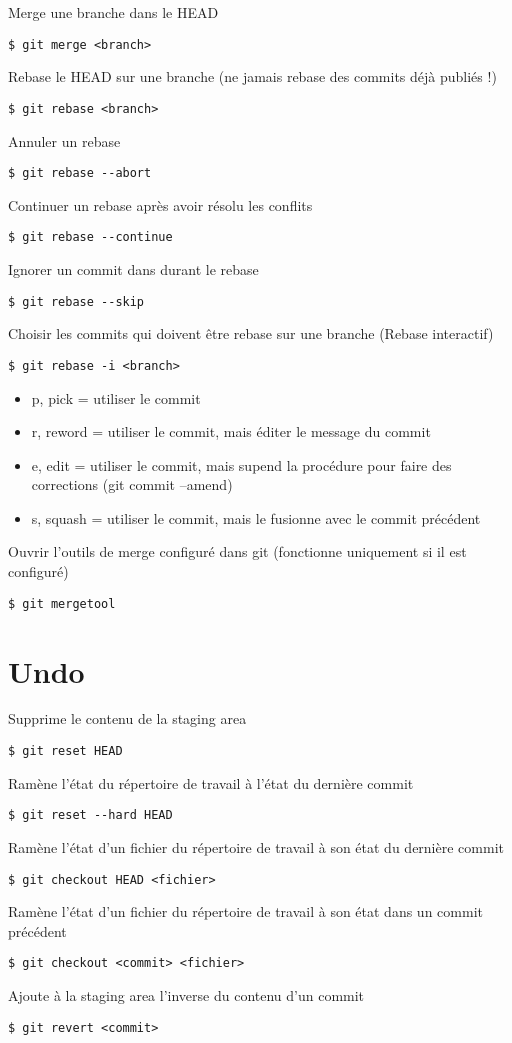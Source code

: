 \documentclass[jou,floatsintext]{apa6}
\begin{document}
Merge une branche dans le HEAD
\begin{lstlisting}
$ git merge <branch>
\end{lstlisting}
Rebase le HEAD sur une branche (ne jamais rebase des commits déjà publiés !)
\begin{lstlisting}
$ git rebase <branch> 
\end{lstlisting}
Annuler un rebase 
\begin{lstlisting}
$ git rebase --abort 
\end{lstlisting}
Continuer un rebase après avoir résolu les conflits 
\begin{lstlisting}
$ git rebase --continue 
\end{lstlisting}
Ignorer un commit dans durant le rebase
\begin{lstlisting}
$ git rebase --skip
\end{lstlisting}
Choisir les commits qui doivent être rebase sur une branche (Rebase interactif) 
\begin{lstlisting}
$ git rebase -i <branch> 
\end{lstlisting}
\begin{itemize}
	\item p, pick = utiliser le commit
	\item r, reword = utiliser le commit, mais éditer le message du commit
	\item e, edit = utiliser le commit, mais supend la procédure pour faire des corrections (git commit --amend)
	\item s, squash = utiliser le commit, mais le fusionne avec le commit précédent
\end{itemize}
Ouvrir l'outils de merge configuré dans git (fonctionne uniquement si il est configuré)
\begin{lstlisting}
$ git mergetool 
\end{lstlisting}
\section{Undo}	
Supprime le contenu de la staging area 
\begin{lstlisting}
$ git reset HEAD 
\end{lstlisting}
Ramène l'état du répertoire de travail à l'état du dernière commit 
\begin{lstlisting}
$ git reset --hard HEAD 
\end{lstlisting}
Ramène l'état d'un fichier du répertoire de travail à son état du dernière commit 
\begin{lstlisting}
$ git checkout HEAD <fichier>
\end{lstlisting}
Ramène l'état d'un fichier du répertoire de travail à son état dans un commit précédent 
\begin{lstlisting}
$ git checkout <commit> <fichier>
\end{lstlisting}
Ajoute à la staging area l'inverse du contenu d'un commit 
\begin{lstlisting}
$ git revert <commit>
\end{lstlisting}
\end{document}
